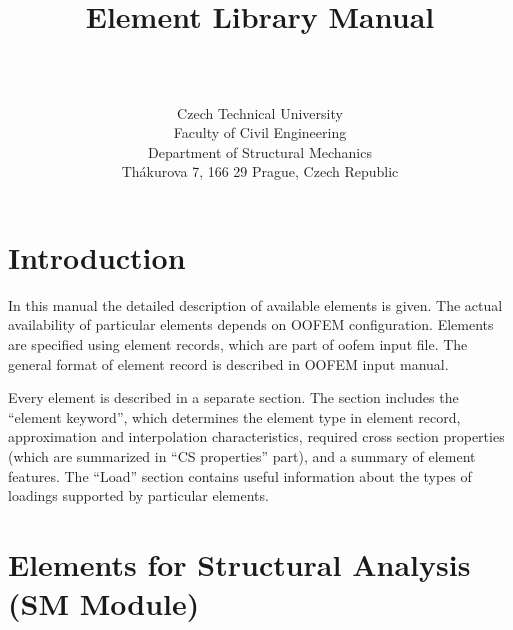 \documentclass[a4paper]{article}
\begin{document}
\title{
\begin{center}\end{center}
Element Library Manual}
\author{\bp \\ \\
Czech Technical University\\
Faculty of Civil Engineering\\
Department of Structural Mechanics\\
Th\'akurova 7, 166 29 Prague, Czech Republic
}
\maketitle
\newpage
\tableofcontents
\newpage
\listoffigures

\section{Introduction}
In this manual the detailed description of available elements 
is given. The actual availability of particular elements depends on
OOFEM configuration. Elements are specified using element records,
which are part of oofem input file. The general format of element
record is described in OOFEM input manual. 

Every element is described in a separate section. The section includes the ``element keyword'', which
determines the element type in element record, approximation and
interpolation characteristics, required cross section properties
(which are summarized in ``CS properties'' part), and a summary of
element features. The ``Load'' section contains useful
information about the types of loadings supported by particular elements.



\section{Elements for Structural Analysis\\(SM Module)}
\end{document}
